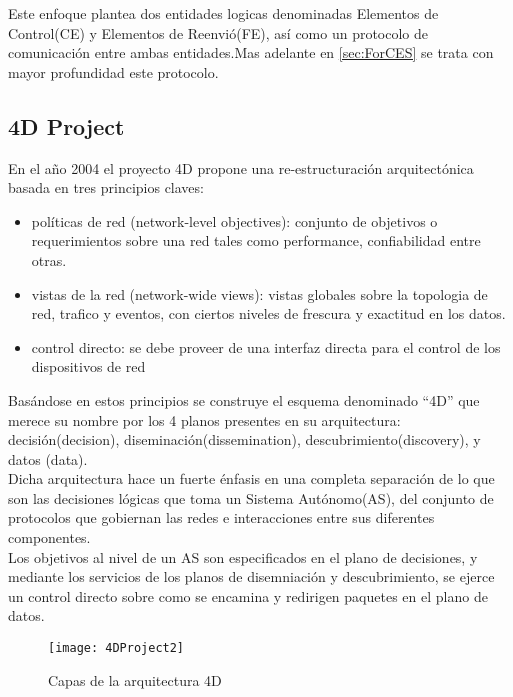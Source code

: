 Este enfoque plantea dos entidades logicas denominadas Elementos de Control(CE) y Elementos de Reenvió(FE), así como un protocolo de comunicación entre ambas entidades.Mas adelante en \ref{sec:ForCES} se trata con mayor profundidad este protocolo.

\subsection{4D Project}
En el año 2004 el proyecto 4D \citep{rexford2004network}\citep{greenberg2005clean} propone una re-estructuración arquitectónica basada en tres principios claves: 

\begin{itemize}
\item políticas de red (network-level objectives): conjunto de objetivos o requerimientos sobre una red tales como performance, confiabilidad entre otras.

\item vistas de la red (network-wide views): vistas globales sobre la topologia de red, trafico y eventos, con ciertos niveles de frescura y exactitud en los datos.

\item control directo: se debe proveer de una interfaz directa para el control de los dispositivos de red
\end{itemize}

Basándose en estos principios se construye el esquema denominado ``4D'' que merece su nombre por los 4 planos presentes en su arquitectura: decisión(decision), diseminación(dissemination), descubrimiento(discovery), y datos (data).\\

Dicha arquitectura hace un fuerte énfasis en una completa separación de lo que son las decisiones lógicas que toma un Sistema Autónomo(AS), del conjunto de protocolos que gobiernan las redes e interacciones entre sus diferentes componentes.\\

Los objetivos al nivel de un AS son especificados en el plano de decisiones, y mediante los servicios de los planos de disemniación y descubrimiento, se ejerce un control directo sobre como se encamina y redirigen paquetes en el plano de datos.\\

\begin{figure}[htbp!] 
\centering    
\texttt{[image: 4DProject2]}
\caption[Capas de la arquitectura 4D]{Capas de la arquitectura 4D}
\label{fig:4DProject}
\end{figure}

